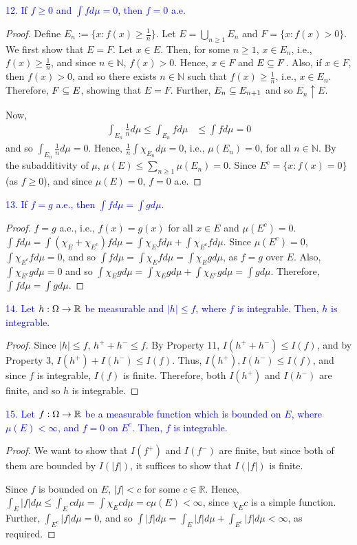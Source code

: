 \textcolor{blue}{12. If $f \geq 0$ and $\int f d\mu = 0$, then $f = 0$ a.e.}
\begin{proof}
    Define $E_n := \{ x: f(x) \geq \frac{1}{n} \}$. Let $E = \bigcup _{n \geq 1} E_n$ and $F = \{ x: f(x) > 0\}$. We first show that $E = F$. Let $x \in E$. Then, for some $n \geq 1$, $x \in E_n$, i.e., $f(x) \geq \frac{1}{n}$, and since $n \in \mathbb{N}$, $f(x) > 0$. Hence, $x \in F$ and $E \subseteq F$. Also, if $x \in F$, then $f(x) > 0$, and so there exists $n \in \mathbb{N}$ such that $f(x) \geq \frac{1}{n}$, i.e., $x \in E_n$. Therefore, $F \subseteq E$, showing that $E = F$. Further, $E_n \subseteq E_{n + 1}$ and so $E_n \uparrow E$. 

    Now, 
    \begin{align*}
        \int_{E_n} \frac{1}{n} d\mu \leq \int_{E_n} f d\mu &\leq \int f d\mu = 0
    \end{align*}
    and so $\int_{E_n} \frac{1}{n} d \mu = 0$. Hence, $\frac{1}{n} \int \chi_{E_n} d\mu = 0$, i.e., $\mu(E_n) = 0$, for all $n \in \mathbb{N}$. By the subadditivity of $\mu$, $\mu(E) \leq \sum_{n \geq 1} \mu(E_n) = 0 $. Since $E^c = \{ x: f(x) = 0\}$ (as $f \geq 0$),  and since $\mu(E) = 0$, $f = 0$ a.e.
\end{proof}

\textcolor{blue}{13. If $f = g$ a.e., then $\int f d\mu = \int g d\mu$.}
\begin{proof}
    $f = g$ a.e., i.e., $f(x) = g(x)$ for all $x \in E$ and $\mu(E^c) = 0$. $\int f d\mu = \int (\chi_E + \chi_{E^c}) f d\mu = \int \chi_E f d\mu + \int \chi_{E^c} f d\mu$. Since $\mu(E^c) = 0$, $\int \chi_{E^c} f d\mu = 0$, and so $\int fd\mu = \int \chi_E f d\mu = \int \chi_E g d\mu$, as $f = g$ over $E$. Also, $\int \chi_{E^c} g d\mu = 0$ and so $\int \chi_E g d\mu = \int \chi_E g d\mu + \int \chi_{E^c} g d\mu = \int g d\mu$. Therefore, $\int f d\mu = \int gd\mu$.
\end{proof}

\textcolor{blue}{14. Let $h: \Omega \to \mathbb{R}$ be measurable and $|h| \leq f$, where $f$ is integrable. Then, $h$ is integrable.}
\begin{proof}
    Since $|h| \leq f$, $h^+ + h^- \leq f$. By Property 11, $I(h^+ + h^-) \leq I(f)$, and by Property 3, $I(h^+) + I(h^-) \leq I(f)$. Thus, $I(h^+), I (h^-) \leq I(f)$, and since $f$ is integrable, $I(f)$ is finite. Therefore, both $I(h^+)$ and $I(h^-)$ are finite, and so $h$ is integrable.
\end{proof}

\textcolor{blue}{15. Let $f:\Omega \to \mathbb{R}$  be a measurable function which is bounded on $E$, where $\mu(E) < \infty$, and $f = 0$ on $E^c$. Then, $f$ is integrable.}
\begin{proof}
    We want to show that $I(f^+)$ and $I(f^-)$ are finite, but since both of them are bounded by $I(|f|)$, it suffices to show that $I(|f|)$ is finite.

    Since $f$ is bounded on $E$, $|f| < c$ for some $c \in \mathbb{R}$. Hence, $\int_E |f| d\mu \leq \int_E c d\mu = \int \chi_{E} c d\mu = c \mu(E) < \infty$, since $\chi_{E}c$ is a simple function. Further, $\int_{E^c} |f| d \mu = 0$, and so $\int |f| d\mu = \int_E |f| d\mu + \int_{E^c} |f|d\mu < \infty$, as required.
\end{proof}



